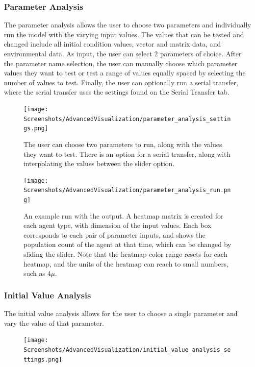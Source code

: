 \subsubsection{Parameter Analysis}
The parameter analysis allows the user to choose two parameters and individually run the model with the varying input values. 
The values that can be tested and changed include all initial condition values, vector and matrix data, and environmental data. 
As input, the user can select 2 parameters of choice. 
After the parameter name selection, the user can manually choose which parameter values they want to test or test a range of values equally spaced by selecting the number of values to test. 
Finally, the user can optionally run a serial transfer, where the serial transfer uses the settings found on the Serial Transfer tab. 
\begin{figure}
    \centering
    \texttt{[image: Screenshots/AdvancedVisualization/parameter\_analysis\_settings.png]}
    \caption{
        The user can choose two parameters to run, along with the values they want to test. 
        There is an option for a serial transfer, along with interpolating the values between the slider option. 
    }
    \label{fig:ss:av:parameter_analysis_settings}
\end{figure}
\begin{figure}
    \centering
    \texttt{[image: Screenshots/AdvancedVisualization/parameter\_analysis\_run.png]}
    \caption{
        An example run with the output. 
        A heatmap matrix is created for each agent type, with dimension of the input values. 
        Each box corresponds to each pair of parameter inputs, and shows the population count of the agent at that time, which can be changed by sliding the slider. 
        Note that the heatmap color range resets for each heatmap, and the units of the heatmap can reach to small numbers, such as $4\mu$. 
    }
    \label{fig:ss:av:parameter_analysis_run}
\end{figure}


\subsubsection{Initial Value Analysis}
The initial value analysis allows for the user to choose a single parameter and vary the value of that parameter. 

\begin{figure}
    \centering
    \texttt{[image: Screenshots/AdvancedVisualization/initial\_value\_analysis\_settings.png]}
    \caption{
    }
    \label{fig:ss:av:initial_value_analysis_settings}
\end{figure}

